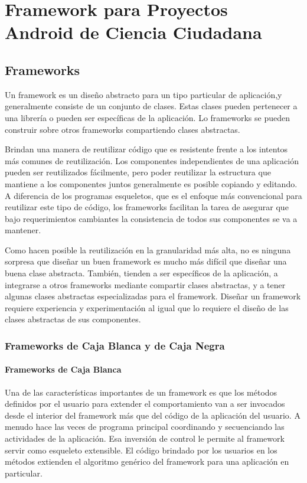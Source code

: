 \chapter{Framework para Proyectos Android de Ciencia Ciudadana}

\section{Frameworks}

	Un framework es un diseño abstracto para un tipo particular de aplicación,y generalmente consiste de un conjunto de clases. Estas clases pueden pertenecer a una librería o pueden ser específicas de la aplicación. Lo frameworks se pueden construir sobre otros frameworks compartiendo clases abstractas.
	
	Brindan una manera de reutilizar código que es resistente frente a los intentos más comunes de reutilización. Los componentes independientes de una aplicación pueden ser reutilizados fácilmente, pero poder reutilizar la estructura que mantiene a los componentes juntos generalmente es posible copiando y editando. A diferencia de los programas esqueletos, que es el enfoque más convencional para reutilizar este tipo de código, los frameworks facilitan la tarea de asegurar que bajo requerimientos cambiantes la consistencia de todos sus componentes se va a mantener.
	
	Como hacen posible la reutilización en la granularidad más alta, no es ninguna sorpresa que diseñar un buen framework es mucho más difícil que diseñar una buena clase abstracta. También, tienden a ser específicos de la aplicación, a integrarse a otros frameworks mediante compartir clases abstractas, y a tener algunas clases abstractas especializadas para el framework. Diseñar un framework requiere experiencia y experimentación al igual que lo requiere el diseño de las clases abstractas de sus componentes.

\subsection{Frameworks de Caja Blanca y de Caja Negra}
\subsubsection{Frameworks de Caja Blanca}

	Una de las características importantes de un framework es que los métodos definidos por el usuario para extender el comportamiento van a ser invocados desde el interior del framework más que del código de la aplicación del usuario. A menudo hace las veces de programa principal coordinando y secuenciando las actividades de la aplicación. Esa inversión de control le permite al framework servir como esqueleto extensible. El código brindado por los usuarios en los métodos extienden el algoritmo genérico del framework para una aplicación en particular. 
	
